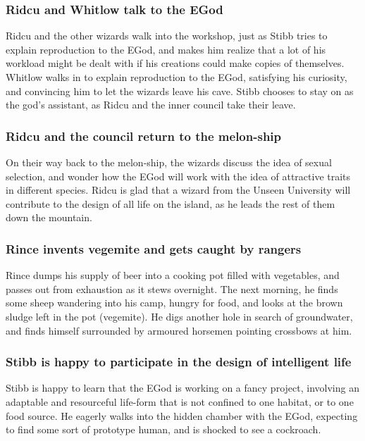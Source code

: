 \subsubsection{\Gls{Ridcu} and \Gls{Whitlow} talk to the \Gls{EGod}}
\Gls{Ridcu} and the other wizards walk into the workshop, just as \Gls{Stibb} tries to explain
reproduction to the \Gls{EGod}, and makes him realize that a lot of his workload might be dealt with
if his creations could make copies of themselves. \Gls{Whitlow} walks in to explain reproduction to
the \Gls{EGod}, satisfying his curiosity, and convincing him to let the wizards leave his cave.
\Gls{Stibb} chooses to stay on as the god's assistant, as \Gls{Ridcu} and the inner council take
their leave.

\subsubsection{\Gls{Ridcu} and the council return to the melon-ship}
On their way back to the melon-ship, the wizards discuss the idea of sexual selection, and wonder
how the \Gls{EGod} will work with the idea of attractive traits in different species. \Gls{Ridcu}
is glad that a wizard from the Unseen University will contribute to the design of all life on the
island, as he leads the rest of them down the mountain.

\subsubsection{\Gls{Rince} invents vegemite and gets caught by rangers}
\Gls{Rince} dumps his supply of beer into a cooking pot filled with vegetables, and passes out from
exhaustion as it stews overnight. The next morning, he finds some sheep wandering into his camp,
hungry for food, and looks at the brown sludge left in the pot (vegemite). He digs another hole in
search of groundwater, and finds himself surrounded by armoured horsemen pointing crossbows at
him.

\subsubsection{\Gls{Stibb} is happy to participate in the design of intelligent life}
\Gls{Stibb} is happy to learn that the \Gls{EGod} is working on a fancy project, involving an
adaptable and resourceful life-form that is not confined to one habitat, or to one food source. He
eagerly walks into the hidden chamber with the \Gls{EGod}, expecting to find some sort of prototype
human, and is shocked to see a cockroach.


